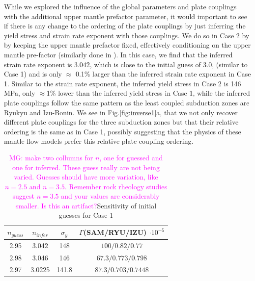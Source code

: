 \documentclass[12pt]{article}
\newcommand{\mgnote}[1]{\textcolor{magenta}{MG: #1}}
\begin{document}
	
While we explored the influence of the global parameters and plate couplings with the additional upper mantle prefactor parameter, it would important to see if there is any change to the ordering of the plate couplings by just inferring the yield stress and strain rate exponent with those couplings. We do so in Case 2 by  by keeping the upper mantle prefactor fixed, effectively conditioning on the upper mantle pre-factor (similarly done in \citep{ratnaswamy2015adjoint}). In this case, we find that the inferred strain rate exponent is 3.042, which is close to the initial guess of 3.0, (similar to Case 1) and is only $\approx$ 0.1\% larger than the inferred strain rate exponent in Case 1. Similar to the strain rate exponent, the inferred yield stress in Case 2 is 146 MPa, only $\approx$1\% lower than the inferred yield stress in Case 1, while the inferred plate couplings follow the same pattern as the least coupled subduction zones are Ryukyu and Izu-Bonin. We see in Fig.\ref{fig:inverse1}a, that we not only recover different plate couplings for the three subduction zones but that their relative ordering is the same as in Case 1, possibly suggesting that the physics of these mantle flow models prefer this relative plate coupling ordering. 

\begin{table}[H]
		\caption{\mgnote{make two collumns for $n$, one for guessed and one for inferred. These guess really are not being varied. Guesses should have more variation, like $n=2.5$ and $n=3.5$. Remember rock rheology studies suggest $n=3.5$ and your values are considerably smaller. Is this an artifact?}Sensitivity of initial guesses for Case 1} %
		\centering  %
		\begin{tabular}{ c c c c } %
		\hline \hline                        %
		 $n_{guess}$ &$n_{infer}$ &$\sigma_y$&$\Gamma $(SAM/RYU/IZU) $\cdot 10^{-5}$   \\ [0.5ex] %
		\hline                  %
	         2.95 &3.042 & 148 & $100/0.82/0.77$    \\
	         2.98 &3.046 & 146 & $67.3/0.773/0.798$  \\
	        2.97 &3.0225 & 141.8 & $87.3/0.703/0.7448$  \\             
                \hline %
		\end{tabular}
		\label{table:initial_guess} %
		\end{table}
\end{document}
